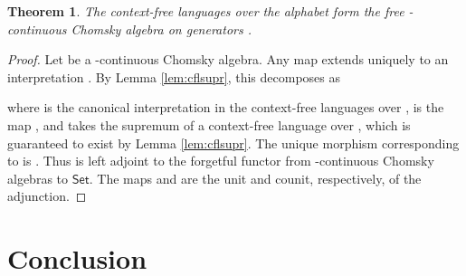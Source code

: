 \documentclass[copyright,creativecommons]{eptcs}
\newtheorem{theorem}{Theorem}[section]
\theoremstyle{remark}
\newcommand\mathname[1]{\ensuremath{\mathsf{#1}}}
\newcommand\Set{\mathname{Set}}
\begin{document}
\begin{theorem}
The context-free languages over the alphabet  form the free -continuous Chomsky algebra on generators .
\end{theorem}
\begin{proof}
Let  be a -continuous Chomsky algebra.
Any map  extends uniquely to an interpretation . By Lemma \ref{lem:cflsupr}, this decomposes as

where  is the canonical interpretation in the context-free languages over ,  is the map , and  takes the supremum of a context-free language over , which is guaranteed to exist by Lemma \ref{lem:cflsupr}. The unique morphism  corresponding to  is . Thus  is left adjoint to the forgetful functor from -continuous Chomsky algebras to \Set. The maps  and  are the unit and counit, respectively, of the adjunction.
\end{proof}

\section{Conclusion}
\end{document}
